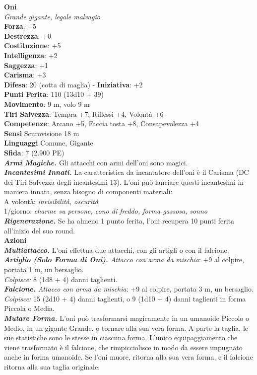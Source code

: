 \begin{multicols}{2}
\medskip\textbf{Oni}\\
\emph{Grande gigante, legale malvagio}\\
\textbf{Forza}: +5\\
\textbf{Destrezza}: +0\\
\textbf{Costituzione}: +5\\
\textbf{Intelligenza}: +2\\
\textbf{Saggezza}: +1\\
\textbf{Carisma}: +3\\
\textbf{Difesa}: 20 (cotta di maglia) - \textbf{Iniziativa}: +2\\
\textbf{Punti Ferita}: 110 (13d10 + 39)\\
\textbf{Movimento}: 9 m, volo 9 m  \\
\textbf{Tiri Salvezza}: Tempra +7, Riflessi +4, Volontà +6\\
\textbf{Competenze}: Arcano +5, Faccia tosta +8, Consapevolezza +4\\
\textbf{Sensi} Scurovisione 18 m\\
\textbf{Linguaggi} Comune, Gigante\\
\textbf{Sfida}: 7 (2.900 PE)\smallskip\\
\emph{\textbf{Armi Magiche.}} Gli attacchi con armi dell'oni sono magici.\\
\emph{\textbf{Incantesimi Innati.}} La caratteristica da incantatore dell'oni è il Carisma (DC dei Tiri Salvezza degli incantesimi 13). L'oni può lanciare questi incantesimi in maniera innata, senza bisogno di componenti materiali:\\
A volontà: \emph{invisibilità, oscurità}\\
1/giorno: \emph{charme su persone, cono di freddo, forma gassosa,} \emph{sonno}\\
\emph{\textbf{Rigenerazione.}} Se ha almeno 1 punto ferita, l'oni recupera 10 punti ferita all'inizio del suo round.\\
\smallskip\textbf{Azioni}\\
\emph{\textbf{Multiattacco.}} L'oni effettua due attacchi, con gli artigli o con il falcione.\\
\emph{\textbf{Artiglio (Solo Forma di Oni).} Attacco con arma da mischia}: +9 al colpire, portata 1 m, un bersaglio.\\
\emph{Colpisce:} 8 (1d8 + 4) danni taglienti.\\
\emph{\textbf{Falcione.} Attacco con arma da mischia}: +9 al colpire, portata 3 m, un bersaglio.\\
\emph{Colpisce:} 15 (2d10 + 4) danni taglienti, o 9 (1d10 + 4) danni taglienti in forma Piccola o Media.\\
\emph{\textbf{Mutare Forma.}} L'oni può trasformarsi magicamente in un umanoide Piccolo o Medio, in un gigante Grande, o tornare alla sua vera forma. A parte la taglia, le sue statistiche sono le stesse in ciascuna forma. L'unico equipaggiamento che viene trasformato è il falcione, che rimpicciolisce in modo da essere impugnato anche in forma umanoide. Se l'oni muore, ritorna alla sua vera forma, e il falcione ritorna alla sua taglia originale.\\


\end{multicols}
